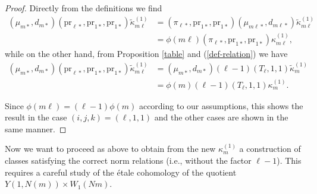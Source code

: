 \documentclass[10pt,letterpaper]{amsart}
\theoremstyle{plain}
\theoremstyle{definition}
\theoremstyle{definition}
\theoremstyle{plain}
\theoremstyle{plain}
\theoremstyle{plain}
\theoremstyle{remark}
\numberwithin{equation}{section}
\begin{document}
\begin{proof}
Directly from the definitions we find
\begin{align*}
(\mu_{m*},d_{m*})({\mathrm{pr}}_{\ell*},{\mathrm{pr}}_{1*},{\mathrm{pr}}_{1*})\tilde{\kappa}_{m\ell}^{(1)}&
=(\pi_{\ell*},{\mathrm{pr}}_{1*},{\mathrm{pr}}_{1*})(\mu_{m\ell*},d_{m\ell*})\tilde{\kappa}_{m\ell}^{(1)}\\
&=\phi(m\ell)(\pi_{\ell*},{\mathrm{pr}}_{1*},{\mathrm{pr}}_{1*})\kappa_{m\ell}^{(1)},
\end{align*}
while on the other hand, from Proposition \ref{table} and (\ref{def-relation}) we have
\begin{align*}
(\mu_{m*},d_{m*})({\mathrm{pr}}_{\ell*},{\mathrm{pr}}_{1*},{\mathrm{pr}}_{1*})\tilde{\kappa}_{m\ell}^{(1)}&=(\mu_{m*},d_{m*})(\ell-1)(T_\ell,1,1)\tilde{\kappa}_m^{(1)}\\
&=\phi(m)(\ell-1)(T_\ell,1,1)\kappa_m^{(1)}.
\end{align*}

Since $\phi(m\ell)=(\ell-1)\phi(m)$ according to our assumptions, this shows the result in the case $(i,j,k)=(\ell,1,1)$ and the other cases are shown in the same manner.
\end{proof}

Now we want to proceed as above to obtain from the new $\kappa_m^{(1)}$ a construction of classes satisfying the correct norm relations (i.e., without the factor $\ell-1$). This requires a careful study of the \'etale cohomology of the quotient $Y(1,N(m))\times W_1(Nm)$.
\end{document}
